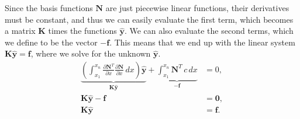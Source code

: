 \documentclass[acmtog]{acmart}
\begin{document}
Since the basis functions $\boldsymbol N$ are just piecewise linear functions, their derivatives must be constant, and thus we can easily evaluate the first term, which becomes a matrix $\boldsymbol K$ times the functions $\boldsymbol{\hat{y}}$. We can also evaluate the second terms, which we define to be the vector $- \mathbf f$. This means that we end up with the linear system $\boldsymbol K \boldsymbol{\hat{y}} = \mathbf f$, where we solve for the unknown $\boldsymbol{\hat{y}}$.
%
\begin{align}
  \underbrace{ \left(  \int_{x_1}^{x_n} \frac{ \partial \boldsymbol N^T }{ \partial x } \frac{ \partial \boldsymbol N}{ \partial x } \, dx \right) \boldsymbol {\hat{y}} }_{ \boldsymbol K \boldsymbol {\hat{y}} } + \underbrace{ \int_{x_1}^{x_n} \boldsymbol N^T\, c \, dx}_{ - \mathbf f } & = 0,             \\
  \boldsymbol K \boldsymbol {\hat{y}} - \mathbf f                                                                                                                                                                                                                                             & = \boldsymbol 0, \\
  \boldsymbol K \boldsymbol {\hat{y}}                                                                                                                                                                                                                                                         & = \mathbf f.
\end{align}
%
\end{document}
